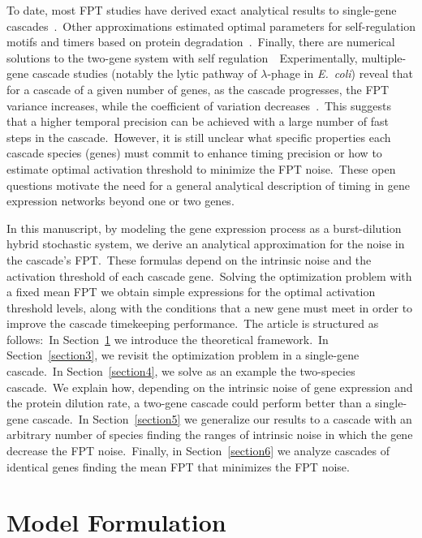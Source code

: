 \documentclass[aps,prb,reprint,superscriptaddress]{revtex4-2}
\begin{document}
To date, most FPT studies have derived exact analytical results to single-gene cascades~\cite{rijal2022exact}.~Other approximations estimated optimal parameters for self-regulation motifs and timers based on protein degradation~\cite{ghusinga2017first,nieto2022feedback,rezaee2024controlling,dey2021feedforward}.~Finally, there are numerical solutions to the two-gene system with self regulation~\cite{gupta2018temporal,gupta2020temporal}~Experimentally, multiple-gene cascade studies (notably the lytic pathway of $\lambda$-phage in \textit{E.~coli}) reveal that for a cascade of a given number of genes, as the cascade progresses, the FPT variance increases, while the coefficient of variation decreases~\cite{amir2007noise}.~This suggests that a higher temporal precision can be achieved with a large number of fast steps in the cascade.~However, it is still unclear what specific properties each cascade species (genes) must commit to enhance timing precision or how to estimate optimal activation threshold to minimize the FPT noise.~These open questions motivate the need for a general analytical description of timing in gene expression networks beyond one or two genes.

In this manuscript, by modeling the gene expression process as a burst-dilution hybrid stochastic system, we derive an analytical approximation for the noise in the cascade's FPT.~These formulas depend on the intrinsic noise and the activation threshold of each cascade gene.~Solving the optimization problem with a fixed mean FPT we obtain simple expressions for the optimal activation threshold levels, along with the conditions that a new gene must meet in order to improve the cascade timekeeping performance.~The article is structured as follows:~In Section~\ref{section2} we introduce the theoretical framework.~In Section~\ref{section3}, we revisit the optimization problem in a single-gene cascade.~In Section~\ref{section4}, we solve as an example the two-species cascade.~We explain how, depending on the intrinsic noise of gene expression and the protein dilution rate, a two-gene cascade could perform better than a single-gene cascade.~In Section~\ref{section5} we generalize our results to a cascade with an arbitrary number of species finding the ranges of intrinsic noise in which the gene decrease the FPT noise.~Finally, in Section~\ref{section6} we analyze cascades of identical genes finding the mean FPT that minimizes the FPT noise.~

\section{Model Formulation}\label{section2}
\end{document}
